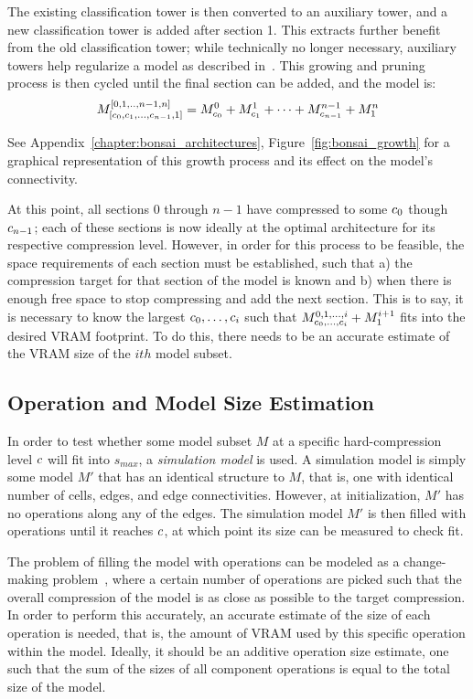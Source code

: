 \noindent The existing classification tower is then converted to an auxiliary tower, and a new classification tower is added
after section 1. This extracts further benefit from the old classification tower; while technically no longer necessary,
auxiliary towers help regularize a model as described in~\cite{szegedy2014}.  This growing and pruning process is then
cycled until the final section can be added, and the model is:
\begin{align}
M^{[0,1,..,n-1,n]}_{[c_0,c_1,\dots,c_{n-1},1]} =  M^{0}_{c_0} +  M^{1}_{c_1} + \dots + M^{n-1}_{c_{n-1}} + M^{n}_{1}
\end{align}

See Appendix~\ref{chapter:bonsai_architectures}, Figure~\ref{fig:bonsai_growth} for a graphical representation
of this growth process and its effect on the model's connectivity.

At this point, all sections 0 through $n-1$ have compressed to some $c_0$ though $c_{n-1}$; each of these sections
is now ideally at the optimal architecture for its respective compression level.  However, in order for this process
to be feasible, the space requirements of each section must be established, such that
a) the compression target for that section of the model is known and b) when there is enough free space
to stop compressing and add the next section. This is to say, it is necessary to know the largest $c_0, \dots, c_i$ such that
$M^{0,1,\dots,i}_{c_0, \dots, c_i} +  M^{i+1}_{1}$ fits into the desired VRAM footprint. To do this, there needs to be an accurate
estimate of the VRAM size of the $ith$ model subset.


\subsection{Operation and Model Size Estimation} \label{sect:operation_sizing}
 In order to test whether some model subset $M$ at a specific hard-compression level $c$ will fit into $s_{max}$, a
\textit{simulation model} is used. A simulation model is simply some model $M'$ that has an identical structure to $M$,
that is, one with identical number of cells, edges, and edge connectivities. However, at initialization, $M'$ has
no operations along any of the edges. The simulation model $M'$ is then filled with operations until it
reaches $c$, at which point its size can be measured to check fit.

The problem of filling the model with operations can be modeled as a change-making problem~\citep{wright1975},
where a certain number of operations are picked such that the overall compression of the model is as close
as possible to the target compression. In order to perform this accurately, an accurate estimate of the size of
each operation is needed, that is, the amount of VRAM used by this specific operation within the model. Ideally, it should be
an additive operation size estimate, one such that the sum of the sizes of all component operations is equal
to the total size of the model.

